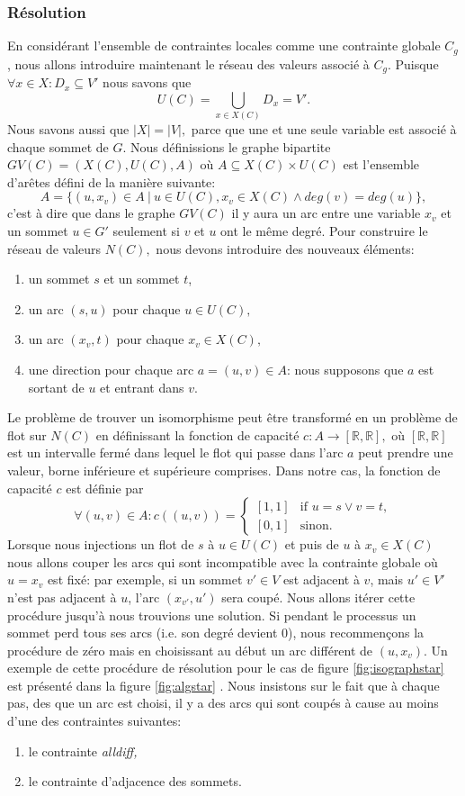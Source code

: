 \documentclass[french]{article}
\theoremstyle{definition}
\theoremstyle{remark}
\begin{document}
\subsubsection{Résolution}
En considérant l'ensemble de contraintes locales comme une contrainte globale $C_g$, nous allons introduire maintenant le réseau des valeurs associé à $C_g$. Puisque $\forall x \in X: D_x \subseteq V'$ nous savons que
$$U(C)=\bigcup_{x \in X(C)} D_x = V'.$$
Nous savons aussi que $|X|=|V|,$ parce que une et une seule variable est associé à chaque sommet de $G$. Nous définissions le graphe bipartite $GV(C)=(X(C), U(C), A)$ où $A \subseteq X(C) \times U(C)$ est l'ensemble d'arêtes défini de la manière suivante:
$$A=\{(u, x_v) \in A\ |\ u \in U(C), x_v \in X(C) \land deg(v)=deg(u) \},$$
c'est à dire que dans le graphe $GV(C)$ il y aura un arc entre une variable $x_v$ et un sommet $u \in G'$ seulement si $v$ et $u$ ont le même degré. 
Pour construire le réseau de valeurs $N(C),$ nous devons introduire des nouveaux éléments:
\begin{enumerate}
	\item un sommet $s$ et un sommet $t$,
	\item un arc $(s, u)$ pour chaque $u \in U(C),$
	\item un arc $(x_v, t)$ pour chaque $x_v \in X(C),$
	\item une direction pour chaque arc $a=(u,v) \in A$: nous supposons que $a$ est sortant de $u$ et entrant dans $v$.
\end{enumerate}
 Le problème de trouver un isomorphisme peut être transformé en un problème de flot sur $N(C)$ en définissant la fonction de capacité $c: A \rightarrow [\mathbb{R}, \mathbb{R}],$ où  $[\mathbb{R}, \mathbb{R}]$ est un intervalle fermé dans lequel le flot qui passe dans l'arc $a$ peut prendre une valeur, borne inférieure et supérieure comprises. Dans notre cas, la fonction de capacité $c$ est définie par
\[  \forall (u,v) \in A:
c((u,v))= 
\begin{cases}
[1,1]& \text{if } u=s \lor v=t,\\
[0,1]              & \text{sinon}.
\end{cases}
\]
Lorsque nous injections un flot de $s$ à $u \in U(C)$ et puis de $u$ à $x_v \in X(C)$ nous allons couper les arcs qui sont incompatible avec la contrainte globale où $u=x_v$ est fixé: par exemple, si un sommet $v' \in V$ est adjacent à $v$, mais $u' \in V'$ n'est pas adjacent à $u$, l'arc $(x_{v'},u')$ sera coupé. Nous allons itérer cette procédure jusqu'à nous trouvions une solution. Si pendant le processus un sommet perd tous ses arcs (i.e. son degré devient $0$), nous recommençons la procédure de zéro mais en choisissant au début un arc différent de $(u, x_v).$
Un exemple de cette procédure de résolution pour le cas de figure \ref{fig:isographstar} est présenté dans la figure \ref{fig:algstar} . Nous insistons sur le fait que à chaque pas, des que un arc est choisi, il y a des arcs qui sont coupés à cause au moins d'une des contraintes suivantes:
\begin{enumerate}
	\item le contrainte \it alldiff, \rm
	\item le contrainte d'adjacence des sommets.
\end{enumerate}
\end{document}
